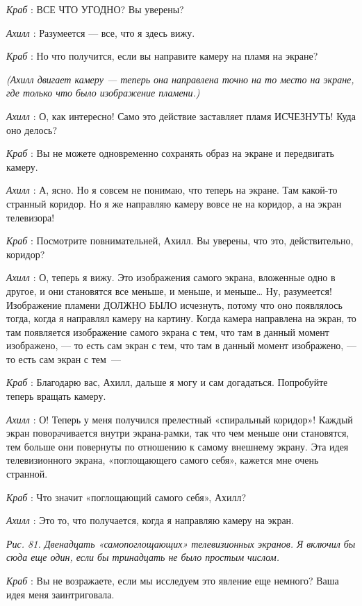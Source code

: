 \emph{Краб} : ВСЕ ЧТО УГОДНО? Вы уверены?

\emph{Ахилл} : Разумеется --- все, что я здесь вижу.

\emph{Краб} : Но что получится, если вы направите камеру на пламя на экране?

\emph{(Ахилл двигает камеру --- теперь она направлена точно на то место на экране, где только что было изображение пламени.)}

\emph{Ахилл} : О, как интересно! Само это действие заставляет пламя ИСЧЕЗНУТЬ! Куда оно делось?

\emph{Краб} : Вы не можете одновременно сохранять образ на экране и передвигать камеру.

\emph{Ахилл} : А, ясно. Но я совсем не понимаю, что теперь на экране. Там какой-то странный коридор. Но я же направляю камеру вовсе не на коридор, а на экран телевизора!

\emph{Краб} : Посмотрите повнимательней, Ахилл. Вы уверены, что это, действительно, коридор?

\emph{Ахилл} : О, теперь я вижу. Это изображения самого экрана, вложенные одно в другое, и они становятся все меньше, и меньше, и меньше\ldots{} Ну, разумеется! Изображение пламени ДОЛЖНО БЫЛО исчезнуть, потому что оно появлялось тогда, когда я направлял камеру на картину. Когда камера направлена на экран, то там появляется изображение самого экрана с тем, что там в данный момент изображено, --- то есть сам экран с тем, что там в данный момент изображено, --- то есть сам экран с тем~---

\emph{Краб} : Благодарю вас, Ахилл, дальше я могу и сам догадаться. Попробуйте теперь вращать камеру.

\emph{Ахилл} : О! Теперь у меня получился прелестный «спиральный коридор»! Каждый экран поворачивается внутри экрана-рамки, так что чем меньше они становятся, тем больше они повернуты по отношению к самому внешнему экрану. Эта идея телевизионного экрана, «поглощающего самого себя», кажется мне очень странной.

\emph{Краб} : Что значит «поглощающий самого себя», Ахилл?

\emph{Ахилл} : Это то, что получается, когда я направляю камеру на экран.

\emph{Рис. 81. Двенадцать «самопоглощающих» телевизионных экранов. Я включил бы сюда еще один, если бы тринадцать не было простым числом.}

\emph{Краб} : Вы не возражаете, если мы исследуем это явление еще немного? Ваша идея меня заинтриговала.

